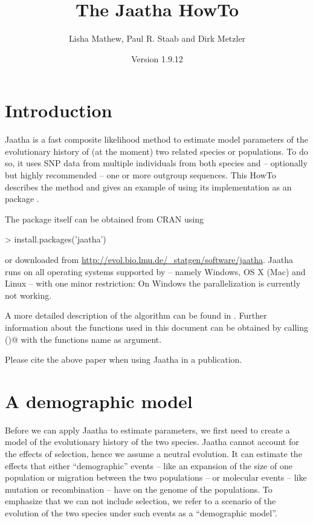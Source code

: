 \documentclass[a4paper]{article}
\begin{document}
\title{The Jaatha HowTo}
\author{Lisha Mathew, Paul R. Staab and Dirk Metzler}
\date{Version 1.9.12}
\maketitle

\section{Introduction}
\noindent
Jaatha is a fast composite likelihood method to estimate model parameters of the
evolutionary history of (at the moment) two related species or populations.
To do so, it uses SNP data from multiple individuals from both species and -- optionally but
highly recommended -- one or more outgroup sequences.
This HowTo describes the method and gives an example of using its implementation
as an \verb@R@ package \verb@jaatha@.

The package itself can be obtained from CRAN
using
\begin{Schunk}
\begin{Sinput}
> install.packages('jaatha')
\end{Sinput}
\end{Schunk}
or downloaded from
\url{http://evol.bio.lmu.de/_statgen/software/jaatha}. Jaatha runs on all
operating systems supported by \verb@R@ -- namely Windows, OS X (Mac) and Linux
-- with one minor restriction: On Windows the parallelization is currently not
working.

A more detailed description of the algorithm can be found in
\cite{naduvilezhath_jaatha:_2011}. 
Further information about the
\verb@R@ functions used in this document can be obtained by calling 
\verb@help()@ with the functions name as argument.

Please cite the above paper when using Jaatha in a publication.


\section{A demographic model}
\noindent
Before we can apply Jaatha to estimate parameters, we first need to create a model
of the evolutionary history of the two species. Jaatha cannot account for the
effects of selection, hence we assume a neutral evolution. It can estimate the 
effects that either ``demographic'' events -- like an expansion of the
size of one population or migration between the two populations -- or molecular events --
like mutation or recombination -- have on the genome of the populations. To
emphasize that we can not include selection, we refer to a scenario of the
evolution of the two species under such events as a ``demographic model''.
\end{document}
